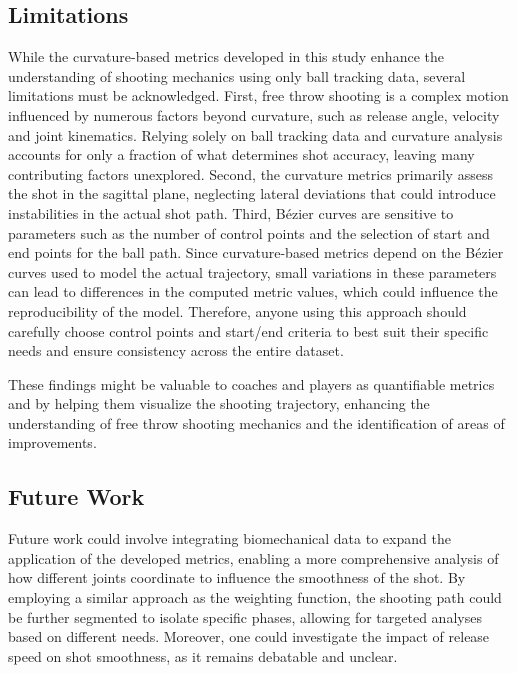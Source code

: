 \documentclass[Review,sageh,times,doublespace]{sagej}
\begin{document}
    \subsection{Limitations}

      While the curvature-based metrics developed in this study enhance the understanding of shooting mechanics using only ball tracking data, several limitations must be acknowledged. First, free throw shooting is a complex motion influenced by numerous factors beyond curvature, such as release angle, velocity and joint kinematics. Relying solely on ball tracking data and curvature analysis accounts for only a fraction of what determines shot accuracy, leaving many contributing factors unexplored. Second, the curvature metrics primarily assess the shot in the sagittal plane, neglecting lateral deviations that could introduce instabilities in the actual shot path. Third, Bézier curves are sensitive to parameters such as the number of control points and the selection of start and end points for the ball path. Since curvature-based metrics depend on the Bézier curves used to model the actual trajectory, small variations in these parameters can lead to differences in the computed metric values, which could influence the reproducibility of the model. Therefore, anyone using this approach should carefully choose control points and start/end criteria to best suit their specific needs and ensure consistency across the entire dataset.

      These findings might be valuable to coaches and players as quantifiable metrics and by helping them visualize the shooting trajectory, enhancing the understanding of free throw shooting mechanics and the identification of areas of improvements.

    \subsection{Future Work}
    
      Future work could involve integrating biomechanical data to expand the application of the developed metrics, enabling a more comprehensive analysis of how different joints coordinate to influence the smoothness of the shot. By employing a similar approach as the weighting function, the shooting path could be further segmented to isolate specific phases, allowing for targeted analyses based on different needs. Moreover, one could investigate the impact of release speed on shot smoothness, as it remains debatable and unclear.



\end{document}

